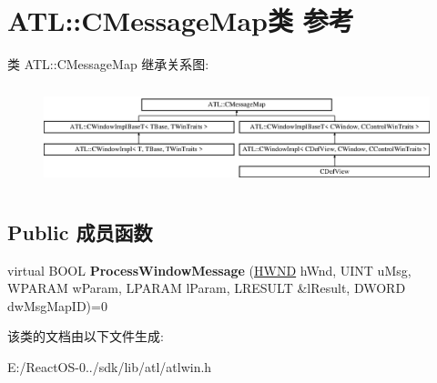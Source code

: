 \hypertarget{class_a_t_l_1_1_c_message_map}{}\section{A\+TL\+:\+:C\+Message\+Map类 参考}
\label{class_a_t_l_1_1_c_message_map}
类 A\+TL\+:\+:C\+Message\+Map 继承关系图\+:\begin{figure}[H]
\begin{center}
\leavevmode
\includegraphics[height=2.962963cm]{class_a_t_l_1_1_c_message_map}
\end{center}
\end{figure}
\subsection*{Public 成员函数}
\begin{DoxyCompactItemize}
\item 
\mbox{\label{class_a_t_l_1_1_c_message_map_aad7657a11fcf749c3123971ea964e220}} 
virtual B\+O\+OL {\bfseries Process\+Window\+Message} (\hyperlink{interfacevoid}{H\+W\+ND} h\+Wnd, U\+I\+NT u\+Msg, W\+P\+A\+R\+AM w\+Param, L\+P\+A\+R\+AM l\+Param, L\+R\+E\+S\+U\+LT \&l\+Result, D\+W\+O\+RD dw\+Msg\+Map\+ID)=0
\end{DoxyCompactItemize}


该类的文档由以下文件生成\+:\begin{DoxyCompactItemize}
\item 
E\+:/\+React\+O\+S-\/0../sdk/lib/atl/atlwin.\+h\end{DoxyCompactItemize}
